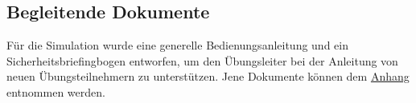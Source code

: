 \subsection{Begleitende Dokumente}
\usepackage{hyperref} 
Für die Simulation wurde eine generelle Bedienungsanleitung und ein Sicherheitsbriefingbogen entworfen, um den Übungsleiter bei der Anleitung von neuen Übungsteilnehmern zu unterstützen. Jene Dokumente können dem \hyperref[sec:anhang]{Anhang} entnommen werden.

